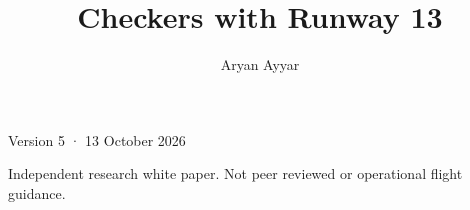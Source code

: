 \documentclass[12pt,nosurname]{RFS}
\begin{document}
\title{Checkers with Runway 13}
\author{Aryan Ayyar}

\maketitle
{\footnotesize\noindent Version 5 · 13 October 2026\par}
\medskip
{\small\noindent Independent research white paper. Not peer reviewed or operational flight guidance.\par}
\clearpage

\bigskip
\FloatBarrier
\FloatBarrier
\FloatBarrier
\FloatBarrier
\FloatBarrier
\FloatBarrier
\FloatBarrier
\clearpage

\clearpage\setlength{\bibsep}{3pt}
\end{document}
